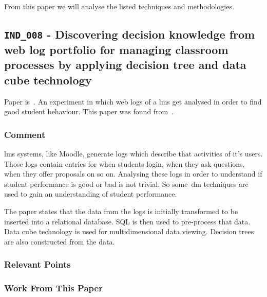 From this paper we will analyse the listed techniques and methodologies.

\subsection{\texttt{IND\_008} - Discovering decision knowledge from web log
portfolio for managing classroom processes by applying decision tree and data
cube technology}


Paper is~\cite{ind_008}. An experiment in which web logs of a \gls{lms} get
analysed in order to find good student behaviour. This paper was found
from~\cite{ind_007}.

\subsubsection{Comment}

\gls{lms} systems, like Moodle, generate logs which describe that activities of
it's users. Those logs contain entries for when students login, when they ask
questions, when they offer proposals on so on. Analysing these logs in order to
understand if student performance is good or bad is not trivial. So
some~\gls{dm} techniques are used to gain an understanding of student
performance.

The paper states that the data from the logs is initially transformed to be
inserted into a relational database. SQL is then used to pre-process that data.
Data cube technology is used for multidimensional data viewing. Decision trees
are also constructed from the data.

\subsubsection{Relevant Points}


\subsubsection{Work From This Paper}

